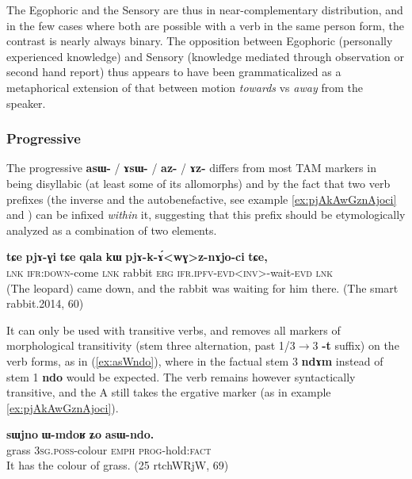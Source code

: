 \documentclass[oldfontcommands,oneside,a4paper,11pt]{article}
\newcommand{\ipa}[1]{\mbox{\phon\textbf{#1}}} %
\begin{document}
The Egophoric and the Sensory are thus in near-complementary distribution, and in the few cases where both are possible with a verb in the same person form, the contrast is nearly always binary. The opposition between Egophoric (personally experienced knowledge) and  Sensory (knowledge mediated through observation or second hand report)  thus appears to have been grammaticalized as a metaphorical extension of that between motion \textit{towards} vs \textit{away} from the speaker.
 
\subsubsection{Progressive} \label{sec:prog}
The progressive \ipa{asɯ-} / \ipa{ɤsɯ-} / \ipa{az-} / \ipa{ɤz-} differs from most TAM markers in being disyllabic (at least some of its allomorphs) and by the fact that two verb prefixes (the inverse and the autobenefactive, see example \ref{ex:pjAkAwGznAjoci} and \citealt{jacques15spontaneous}) can be infixed \textit{within} it, suggesting that this prefix should be etymologically analyzed as a combination of two elements.

\begin{exe}
\ex \label{ex:pjAkAwGznAjoci}
\gll
\ipa{tɕe} 	\ipa{pjɤ-ɣi} 	\ipa{tɕe} 	\ipa{qala} 	\ipa{kɯ} 	\ipa{pjɤ-k-ɤ́<wɣ>z-nɤjo-ci} 	\ipa{tɕe,} \\
\textsc{lnk} \textsc{ifr:down}-come \textsc{lnk} rabbit \textsc{erg} \textsc{ifr.ipfv-evd<inv>}-wait-\textsc{evd} \textsc{lnk} \\
\glt (The leopard) came down, and the rabbit was waiting for him there. (The smart rabbit.2014, 60)
\end{exe}

It can only be used with transitive verbs, and removes all markers of morphological transitivity (stem three alternation, past 1/3$\rightarrow$3 \ipa{-t} suffix) on the verb forms, as in (\ref{ex:asWndo}), where in the factual stem 3 \ipa{ndɤm} instead of stem 1 \ipa{ndo} would be expected. The verb remains however syntactically transitive, and the A still takes the ergative marker (as in example \ref{ex:pjAkAwGznAjoci}).


\begin{exe}
\ex \label{ex:asWndo}
\gll
\ipa{sɯjno} 	\ipa{ɯ-mdoʁ} 	\ipa{ʑo} 	\ipa{asɯ-ndo.} \\
grass \textsc{3sg.poss}-colour \textsc{emph} \textsc{prog}-hold:\textsc{fact} \\
\glt It has the colour of grass. (25 rtchWRjW, 69)
\end{exe}
\end{document}
